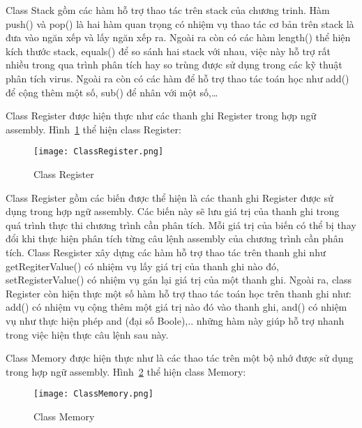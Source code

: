	Class Stack gồm các hàm hỗ trợ thao tác trên stack của chương trinh. Hàm push() và pop() là hai hàm quan trọng có nhiệm vụ thao tác cơ bản trên stack là đưa vào ngăn xếp và lấy ngăn xếp ra. Ngoài ra còn có các hàm length() thể hiện kích thước stack, equals() để so sánh hai stack với nhau, việc này hỗ trợ rất nhiều trong qua trình phân tích hay so trùng được sử dụng trong các kỹ thuật phân tích virus. Ngoài ra còn có các hàm để hỗ trợ thao tác toán học như add() để cộng thêm một số, sub() để nhân với một số,…
			
		\newpage
		Class Register được hiện thực như các thanh ghi Register trong hợp ngữ assembly. Hình~\ref{fig:ClassRegister} thể hiện class Register:
		\begin{center}
			\begin{figure}[htp]
				\begin{center}
					\texttt{[image: ClassRegister.png]}
				\end{center}
				\caption{Class Register}	
					\label{fig:ClassRegister}		
			\end{figure}
		\end{center}		
			
	Class Register gồm các biến được thể hiện là các thanh ghi Register được sử dụng trong hợp ngữ assembly. Các biến này sẽ lưu giá trị của thanh ghi trong quá trình thực thi chương trình cần phân tích. Mỗi giá trị của biến có thể bị thay đổi khi thực hiện phân tích từng câu lệnh assembly của chương trình cần phân tích. Class Resgister xây dựng các hàm hỗ trợ thao tác trên thanh ghi như getRegiterValue() có nhiệm vụ lấy giá trị của thanh ghi nào đó, setRegisterValue() có nhiệm vụ gán lại giá trị của một thanh ghi. Ngoài ra, class Register còn hiện thực một số hàm hỗ trợ thao tác toán học trên thanh ghi như: add() có nhiệm vụ cộng thêm một giá trị nào đó vào thanh ghi, and() có nhiệm vụ như thực hiện phép and (đại số Boole),.. những hàm này giúp hỗ trợ nhanh trong việc hiện thực câu lệnh sau này.
	
		\newpage
	Class Memory được hiện thực như là các thao tác trên một bộ nhớ được sử dụng trong hợp ngữ assembly. Hình~\ref{fig:ClassMemory} thể hiện class Memory: 
	
		\begin{center}
			\begin{figure}[htp]
				\begin{center}
					\texttt{[image: ClassMemory.png]}
				\end{center}
				\caption{Class Memory}	
					\label{fig:ClassMemory}		
			\end{figure}
		\end{center}		
	
